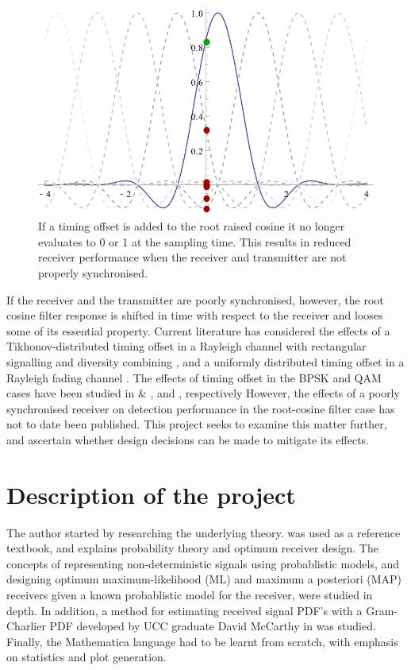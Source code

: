 \begin{figure}[htbp]
\centering
\includegraphics[width=\linewidth]{rrc_err.png}
\caption{If a timing offset is added to the root raised cosine it no
longer evaluates to 0 or 1 at the sampling time. This results in
reduced receiver performance when the receiver and transmitter are not
properly synchronised.}
\end{figure}

If the receiver and the transmitter are poorly synchronised, however,
the root cosine filter response is shifted in time with respect to the
receiver and looses some of its essential property. Current literature
has considered the effects of a Tikhonov-distributed timing offset in a Rayleigh channel with rectangular signalling and diversity combining \cite{[2]}, and a uniformly distributed timing offset in a Rayleigh fading channel \cite{[6]}. The effects of timing offset in the BPSK and QAM cases have been studied in \cite{[3]} \& \cite{[4]}, and \cite{[5]}, respectively However, the effects of a poorly synchronised receiver on detection performance in the root-cosine filter case has not to date been published. This project seeks to examine this matter further, and ascertain whether design decisions can be made to mitigate its effects.

\chapter{Description of the project}

The author started by researching the underlying theory. \cite{[8]} was used as a reference textbook, and explains probability theory and optimum receiver design. The concepts of representing non-deterministic signals using probablistic models, and designing optimum maximum-likelihood (ML) and maximum a posteriori (MAP) receivers given a known probablistic model for the receiver, were studied in depth. In addition, a method for estimating received signal PDF's with a Gram-Charlier PDF developed by UCC graduate David McCarthy in \cite{[1]} was studied. Finally, the Mathematica language had to be learnt from scratch, with emphasis on statistics and plot generation.

